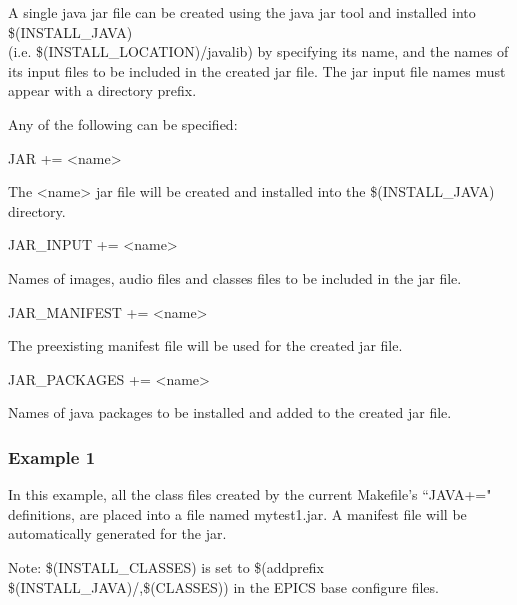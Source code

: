 A single java jar file can be created using the java jar tool and installed into \$(INSTALL\_JAVA) \\
(i.e. \$(INSTALL\_LOCATION)/javalib) by specifying its name, and the names of its input files to be included in the created jar 
file. The jar input file names must appear with a directory prefix.

Any of the following can be specified:

\begin{description}\item {}JAR += \textless{}name\textgreater{}

\end{description}The \textless{}name\textgreater{} jar file will be created and installed into the \$(INSTALL\_JAVA) directory.

\begin{description}\item {}JAR\_INPUT += \textless{}name\textgreater{}

\end{description}Names of images, audio files and classes files to be included in the jar file.

\begin{description}\item {}JAR\_MANIFEST += \textless{}name\textgreater{}

\end{description}The preexisting manifest file will be used for the created jar file.

\begin{description}\item JAR\_PACKAGES += \textless{}name\textgreater{}

\end{description}Names of java packages to be installed and added to the created jar file.

\subsubsection{Example 1}

In this example, all the class files created by the current Makefile's ``JAVA+=" definitions, are placed into a file named 
mytest1.jar. A manifest file will be automatically generated for the jar. 

Note: \$(INSTALL\_CLASSES) is set to \$(addprefix \$(INSTALL\_JAVA)/,\$(CLASSES)) in the EPICS base configure 
files.

